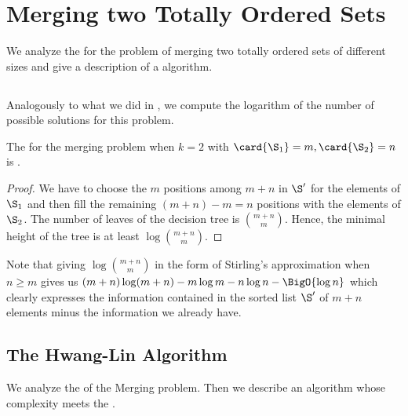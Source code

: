 \section{Merging two Totally Ordered Sets}
\label{tree:merging:k=2}

We analyze the \ITLB for the problem of merging two totally ordered sets of
different sizes and give a description of a \BigO{\ITLB} algorithm.

\subsection{\ITLB}
\label{tree:merging:k=2:ITLB}

Analogously to what we did in , we compute the
logarithm of the number of possible solutions for this problem.
\begin{theorem}
The \ITLB for the merging problem when \(k = 2\) with \(\card{\S_1} = m, \card{\S_2}
= n\) is .
\end{theorem}
\begin{proof}
We have to choose the $m$ positions among $m+n$ in $\S'$ for the elements of
$\S_1$ and then fill the remaining $(m+n) - m = n$ positions with the elements
of $\S_2$. The number of leaves of the decision tree is $\binom{m+n}{m}$.
Hence, the minimal height of the tree is at least $\log \binom{m+n}{m}$.
\end{proof}

Note that giving $\log \binom{m+n}{m}$ in the form of Stirling's approximation
when \(n \ge m\) gives us $(m+n) \log(m+n) - m \log m - n \log n - \BigO{\log
n}$ which clearly expresses the information contained in the sorted list
$\S'$ of $m+n$ elements minus the information we already have.

\subsection{The Hwang-Lin Algorithm}
\label{tree:merging:k=2:alg}

We analyze the \ITLB of the Merging problem. Then we
describe an algorithm whose complexity meets the \ITLB.

